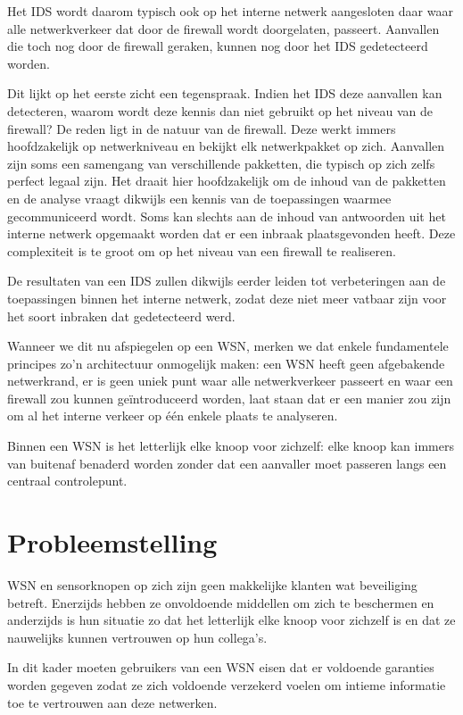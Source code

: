 Het IDS wordt daarom typisch ook op het interne netwerk aangesloten daar waar
alle netwerkverkeer dat door de firewall wordt doorgelaten, passeert. Aanvallen
die toch nog door de firewall geraken, kunnen nog door het IDS gedetecteerd
worden.

Dit lijkt op het eerste zicht een tegenspraak. Indien het IDS deze aanvallen
kan detecteren, waarom wordt deze kennis dan niet gebruikt op het niveau van de
firewall? De reden ligt in de natuur van de firewall. Deze werkt immers
hoofdzakelijk op netwerkniveau en bekijkt elk netwerkpakket op zich. Aanvallen
zijn soms een samengang van verschillende pakketten, die typisch op zich zelfs
perfect legaal zijn. Het draait hier hoofdzakelijk om de inhoud van de
pakketten en de analyse vraagt dikwijls een kennis van de toepassingen waarmee
gecommuniceerd wordt. Soms kan slechts aan de inhoud van antwoorden uit het
interne netwerk opgemaakt worden dat er een inbraak plaatsgevonden heeft. Deze
complexiteit is te groot om op het niveau van een firewall te realiseren.

De resultaten van een IDS zullen dikwijls eerder leiden tot verbeteringen aan
de toepassingen binnen het interne netwerk, zodat deze niet meer vatbaar zijn
voor het soort inbraken dat gedetecteerd werd.

Wanneer we dit nu afspiegelen op een WSN, merken we dat enkele fundamentele
principes zo'n architectuur onmogelijk maken: een WSN heeft geen afgebakende
netwerkrand, er is geen uniek punt waar alle netwerkverkeer passeert en waar
een firewall zou kunnen ge\"introduceerd worden, laat staan dat er een manier
zou zijn om al het interne verkeer op \'e\'en enkele plaats te analyseren.

Binnen een WSN is het letterlijk elke knoop voor zichzelf: elke knoop kan
immers van buitenaf benaderd worden zonder dat een aanvaller moet passeren
langs een centraal controlepunt.

\section{Probleemstelling}
\label{section:probleem}

WSN en sensorknopen op zich zijn geen makkelijke klanten wat beveiliging
betreft. Enerzijds hebben ze onvoldoende middellen om zich te beschermen en
anderzijds is hun situatie zo dat het letterlijk elke knoop voor zichzelf is en
dat ze nauwelijks kunnen vertrouwen op hun collega's.

In dit kader moeten gebruikers van een WSN eisen dat er voldoende garanties
worden gegeven zodat ze zich voldoende verzekerd voelen om intieme informatie
toe te vertrouwen aan deze netwerken.


